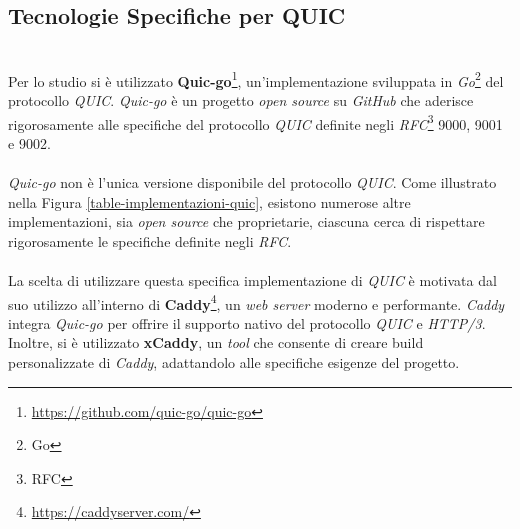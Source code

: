 \subsection{Tecnologie Specifiche per QUIC}
~\\
\indent Per lo studio si è utilizzato \textbf{Quic-go}\footnote{\url{https://github.com/quic-go/quic-go}}, un'implementazione sviluppata in \emph{Go}\footnote{\gls{Go}} del protocollo \emph{QUIC}.
\emph{Quic-go} è un progetto \emph{open source} su \emph{GitHub} che aderisce rigorosamente alle specifiche del protocollo \emph{QUIC} 
definite negli \emph{RFC}\footnote{\gls{RFC}} 9000, 9001 e 9002. 
\\\\
\emph{Quic-go} non è l'unica versione disponibile del protocollo \emph{QUIC}.
Come illustrato nella Figura \ref{table-implementazioni-quic}, esistono numerose altre implementazioni, sia \emph{open source} che proprietarie, ciascuna cerca di rispettare rigorosamente le specifiche definite negli \emph{RFC}. 
\\\\
La scelta di utilizzare questa specifica implementazione di \emph{QUIC} è motivata dal suo utilizzo all'interno di \textbf{Caddy}\footnote{\url{https://caddyserver.com/}}, un \emph{web server} moderno e performante. \emph{Caddy} integra \emph{Quic-go} per offrire il supporto nativo del protocollo \emph{QUIC} e \emph{HTTP/3}.
Inoltre, si è utilizzato \textbf{xCaddy}, un \emph{tool} che consente di creare build personalizzate di \emph{Caddy}, adattandolo alle specifiche esigenze del progetto.

